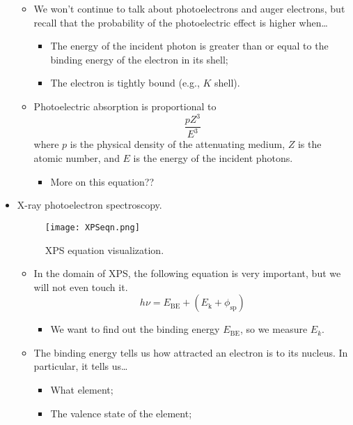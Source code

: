\documentclass[../notes.tex]{subfiles}
\begin{document}
\begin{itemize}
\begin{itemize}
        \item We won't continue to talk about photoelectrons and auger electrons, but recall that the probability of the photoelectric effect is higher when\dots
        \begin{itemize}
            \item The energy of the incident photon is greater than or equal to the binding energy of the electron in its shell;
            \item The electron is tightly bound (e.g., $K$ shell).
        \end{itemize}
        \item Photoelectric absorption is proportional to
        \begin{equation*}
            \frac{pZ^3}{E^3}
        \end{equation*}
        where $p$ is the physical density of the attenuating medium, $Z$ is the atomic number, and $E$ is the energy of the incident photons.
        \begin{itemize}
            \item More on this equation??
        \end{itemize}
    \end{itemize}
    \item X-ray photoelectron spectroscopy.
    \begin{figure}[H]
        \centering
        \texttt{[image: XPSeqn.png]}
        \caption{XPS equation visualization.}
        \label{fig:XPSeqn}
    \end{figure}
    \begin{itemize}
        \item In the domain of XPS, the following equation is very important, but we will not even touch it.
        \begin{equation*}
            h\nu = E_\text{BE}+(E_\text{k}+\phi_\text{sp})
        \end{equation*}
        \begin{itemize}
            \item We want to find out the binding energy $E_\text{BE}$, so we measure $E_k$.
        \end{itemize}
        \item The binding energy tells us how attracted an electron is to its nucleus. In particular, it tells us\dots
        \begin{itemize}
            \item What element;
            \item The valence state of the element;

\end{itemize}
\end{itemize}
\end{itemize}
\end{document}
